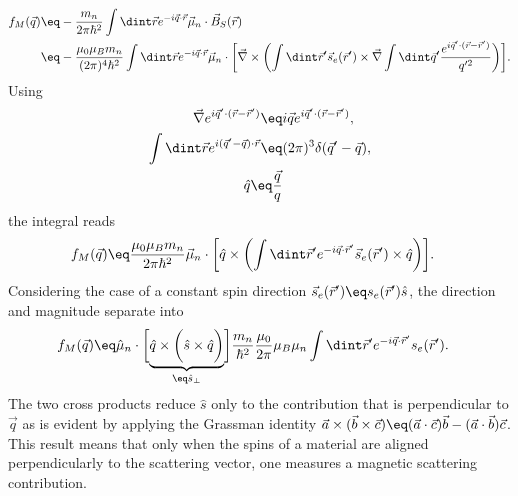\documentclass[\main/dresen_thesis.tex]{subfiles}
\begin{document}
    \begin{align}
      \begin{split}
        f_M (\vec{q})
          &\eq - \frac{m_n}{2\pi \hbar^2} \int \dint \vec{r} e^{-i\vec{q} \cdot \vec{r}}\vec{\mu}_n \cdot \vec{B}_S (\vec{r})\\
          &\eq - \frac{\mu_0 \mu_B m_n}{(2\pi)^4 \hbar^2}  \int \dint \vec{r} e^{-i\vec{q} \cdot \vec{r}}\vec{\mu}_n \cdot \biggl[ \vec{\nabla} \times \biggl(\int \dint \vec{r}^\prime \vec{s}_e(\vec{r}^\prime) \times \vec{\nabla} \int \dint \vec{q}^\prime \frac{e^{i \vec{q}^\prime \cdot (\vec{r} - \vec{r}^\prime)}}{q^{\prime 2}} \biggr) \biggr].
      \end{split}
    \end{align}
    Using
    \begin{align}
      \vec{\nabla}e^{i \vec{q}^\prime \cdot (\vec{r} - \vec{r}^\prime)} \eq& i \vec{q} e^{i \vec{q}^\prime \cdot (\vec{r} - \vec{r}^\prime)},\\
      \int \dint \vec{r} e^{i(\vec{q}^\prime - \vec{q}) \cdot \vec{r}} \eq& (2 \pi)^3 \delta(\vec{q}^\prime - \vec{q}),\\
      \hat{q} \eq \frac{\vec{q}}{q}
    \end{align}
    the integral reads
    \begin{align}
      f_M (\vec{q}) \eq & \frac{\mu_0 \mu_B m_n}{2 \pi \hbar^2} \vec{\mu}_n \cdot \biggl[ \hat{q} \times \biggl( \int \dint \vec{r}^\prime e^{- i \vec{q} \cdot \vec{r}^\prime} \vec{s}_e(\vec{r}^\prime) \times \hat{q}\biggr) \biggr].
    \end{align}
    Considering the case of a constant spin direction $\vec{s}_e (\vec{r}^\prime) \eq s_e (\vec{r}^\prime) \hat{s}$, the direction and magnitude separate into
    \begin{align}
      f_M (\vec{q}) \eq & \hat{\mu}_n \cdot \biggl[ \underbrace{ \hat{q} \times \biggl( \hat{s} \times \hat{q}\biggr) }_{\eq \hat{s}_\perp}\biggr] \frac{m_n}{\hbar^2}  \frac{\mu_0}{2\pi} \mu_B \mu_n   \int \dint \vec{r}^\prime e^{- i \vec{q} \cdot \vec{r}^\prime} s_e(\vec{r}^\prime).
    \end{align}
    The two cross products reduce $\hat{s}$ only to the contribution that is perpendicular to $\vec{q}$ as is evident by applying the Grassman identity $\vec{a} \times (\vec{b} \times \vec{c}) \eq (\vec{a} \cdot \vec{c}) \vec{b} - (\vec{a} \cdot \vec{b}) \vec{c}$.
    This result means that only when the spins of a material are aligned perpendicularly to the scattering vector, one measures a magnetic scattering contribution.
\end{document}
